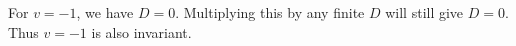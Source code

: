 For $v=-1$, we have $D=0$. Multiplying this by any finite $D$ will still give $D=0$.
Thus $v=-1$ is also invariant.
